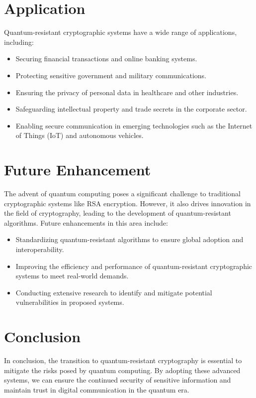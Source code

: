 \documentclass[12pt,a4paper]{report}
\begin{document}
\chapter{Application}
Quantum-resistant cryptographic systems have a wide range of applications, including:
\begin{itemize}
    \item Securing financial transactions and online banking systems.
    \item Protecting sensitive government and military communications.
    \item Ensuring the privacy of personal data in healthcare and other industries.
    \item Safeguarding intellectual property and trade secrets in the corporate sector.
    \item Enabling secure communication in emerging technologies such as the Internet of Things (IoT) and autonomous vehicles.
\end{itemize}

\chapter{Future Enhancement}
The advent of quantum computing poses a significant challenge to traditional cryptographic systems like RSA encryption. However, it also drives innovation in the field of cryptography, leading to the development of quantum-resistant algorithms. Future enhancements in this area include:
\begin{itemize}
    \item Standardizing quantum-resistant algorithms to ensure global adoption and interoperability.
    \item Improving the efficiency and performance of quantum-resistant cryptographic systems to meet real-world demands.
    \item Conducting extensive research to identify and mitigate potential vulnerabilities in proposed systems.
\end{itemize}

\chapter{Conclusion}
In conclusion, the transition to quantum-resistant cryptography is essential to mitigate the risks posed by quantum computing. By adopting these advanced systems, we can ensure the continued security of sensitive information and maintain trust in digital communication in the quantum era.
\end{document}
